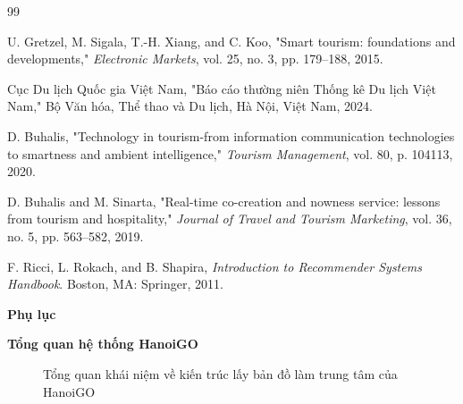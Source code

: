 \documentclass[a4paper,12pt]{report}
\begin{document}
\begin{thebibliography}{99}
\setlength{\itemsep}{0.8em} %

 U. Gretzel, M. Sigala, T.-H. Xiang, and C. Koo, "Smart tourism: foundations and developments," \textit{Electronic Markets}, vol. 25, no. 3, pp. 179--188, 2015.

 Cục Du lịch Quốc gia Việt Nam, "Báo cáo thường niên Thống kê Du lịch Việt Nam," Bộ Văn hóa, Thể thao và Du lịch, Hà Nội, Việt Nam, 2024.

 D. Buhalis, "Technology in tourism-from information communication technologies to smartness and ambient intelligence," \textit{Tourism Management}, vol. 80, p. 104113, 2020.

 D. Buhalis and M. Sinarta, "Real-time co-creation and nowness service: lessons from tourism and hospitality," \textit{Journal of Travel and Tourism Marketing}, vol. 36, no. 5, pp. 563--582, 2019.

 F. Ricci, L. Rokach, and B. Shapira, \textit{Introduction to Recommender Systems Handbook}. Boston, MA: Springer, 2011.

\end{thebibliography}

\newpage
\vspace*{-20pt}
\begin{center}
\huge\bfseries Phụ lục
\end{center}
\vspace{10pt}

\textbf{Tổng quan hệ thống HanoiGO}
\begin{figure}[H]
    \centering
    \caption{Tổng quan khái niệm về kiến trúc lấy bản đồ làm trung tâm của HanoiGO}
    \label{fig:hanoigo_overview_app}
\end{figure}
\end{document}
